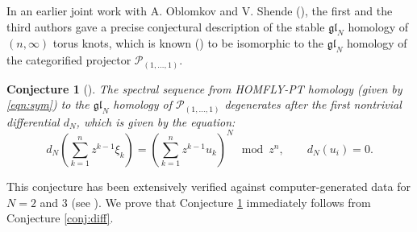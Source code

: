 \documentclass[12pt]{amsart}
\numberwithin{equation}{section}
\newtheorem{conjecture}[theorem]{Conjecture}
\theoremstyle{definition}
\theoremstyle{remark}
\newcommand{\CA}{\mathcal{A}}
\newcommand{\CP}{\mathcal{P}}
\renewcommand{\1}{\mathbf{1}}
\newcommand{\fsl}{\mathfrak{sl}}
\newcommand{\fgl}{\mathfrak{gl}}
\begin{document}
In an earlier joint work with A. Oblomkov and V. Shende (\cite{GORS}), the first and the third authors gave a precise conjectural description of the stable $\fgl_N$ homology of $(n,\infty)$ torus knots,  which is known (\cite{Cautis,Hog,Rose,Roz}) to be isomorphic to the $\fgl_N$ homology of the categorified projector $\CP_{(1,\ldots,1)}$.
\begin{conjecture}[\cite{GORS}]
\label{conj:GORS}
The spectral sequence from HOMFLY-PT homology (given by \eqref{eqn:sym}) to the $\fgl_N$ homology of $\CP_{(1,\ldots,1)}$ degenerates after the first nontrivial differential $d_N$, which is given by the equation:
\begin{equation}
\label{dN symm}
d_N\left(\sum_{k=1}^{n} z^{k-1}\xi_k\right)=\left(\sum_{k=1}^{n}z^{k-1}u_k\right)^{N}\mod z^n, \qquad d_N(u_i)=0.
\end{equation} 
\end{conjecture}
 This conjecture has been extensively verified against computer-generated data for $N=2$ and $3$ (see \cite{GL,GOR}). We prove that  Conjecture \ref{conj:GORS} immediately follows from Conjecture \ref{conj:diff}.







\end{document}

